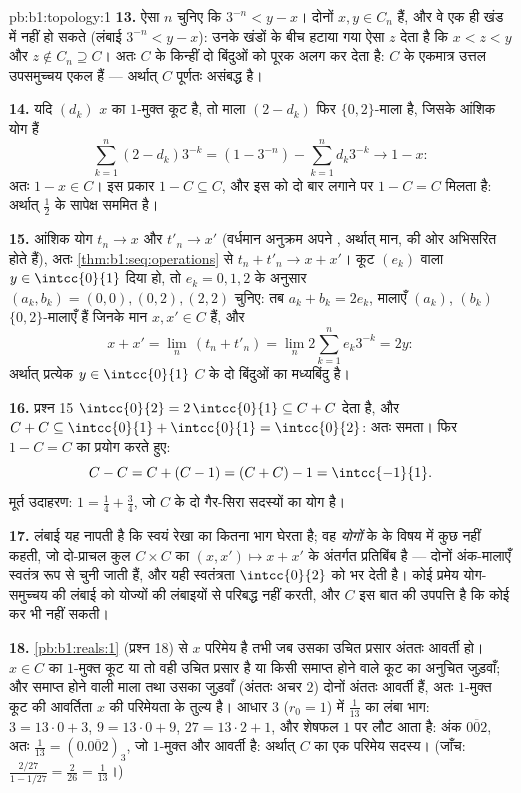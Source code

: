 \begin{solution}{pb:b1:topology:1}
\textbf{13.} ऐसा $n$ चुनिए कि $3^{-n} < y - x$। दोनों $x, y \in C_n$ हैं, और
वे एक ही खंड में नहीं हो सकते (लंबाई $3^{-n} < y - x$): उनके खंडों के बीच
हटाया गया  ऐसा $z$ देता है कि $x < z < y$ और $z \notin C_n \supseteq
C$। अतः $C$ के किन्हीं दो बिंदुओं को पूरक अलग कर देता है: $C$ के एकमात्र
उत्तल उपसमुच्चय एकल  हैं --- अर्थात् $C$ पूर्णतः असंबद्ध है।

\textbf{14.} यदि $(d_k)$ $x$ का $1$-मुक्त कूट है, तो माला $(2 - d_k)$ फिर
$\{0,2\}$-माला है, जिसके आंशिक योग हैं
\[
\sum_{k=1}^{n} (2 - d_k)3^{-k} = (1 - 3^{-n}) - \sum_{k=1}^n
d_k 3^{-k} \longrightarrow 1 - x :
\]
अतः $1 - x \in C$। इस प्रकार $1 - C \subseteq C$, और इस  को दो
बार लगाने पर $1 - C = C$ मिलता है: अर्थात्  $\frac12$ के
सापेक्ष सममित है।

\textbf{15.} आंशिक योग $t_n \to x$ और $t'_n \to x'$ (वर्धमान अनुक्रम अपने
, अर्थात् मान, की ओर अभिसरित होते हैं), अतः
\cref{thm:b1:seq:operations} से $t_n + t'_n \to x + x'$। कूट $(e_k)$ वाला $y
\in \intcc{0}{1}$ दिया हो, तो $e_k = 0, 1, 2$ के अनुसार $(a_k, b_k) = (0,0),
(0,2), (2,2)$ चुनिए: तब $a_k + b_k = 2e_k$, मालाएँ $(a_k)$, $(b_k)$
$\{0,2\}$-मालाएँ हैं जिनके मान $x, x' \in C$ हैं, और
\[
x + x' = \lim_n\,(t_n + t'_n) = \lim_n 2\sum_{k=1}^n e_k 3^{-k}
= 2y :
\]
अर्थात् प्रत्येक $y \in \intcc{0}{1}$ $C$ के दो बिंदुओं का मध्यबिंदु है।

\textbf{16.} प्रश्न 15 $\intcc{0}{2} = 2\,\intcc{0}{1} \subseteq C + C$ देता
है, और $C + C \subseteq \intcc{0}{1} + \intcc{0}{1} = \intcc{0}{2}$: अतः
समता। फिर $1 - C = C$ का प्रयोग करते हुए:
\[
C - C = C + (C - 1) = (C + C) - 1 = \intcc{-1}{1} .
\]
मूर्त उदाहरण: $1 = \frac14 + \frac34$, जो $C$ के दो गैर-सिरा सदस्यों का योग
है।

\textbf{17.} लंबाई यह नापती है कि  स्वयं रेखा का कितना भाग घेरता है;
वह \emph{योगों} के  के विषय में कुछ नहीं कहती, जो दो-प्राचल कुल $C
\times C$ का $(x, x') \mapsto x + x'$ के अंतर्गत प्रतिबिंब है --- दोनों
अंक-मालाएँ स्वतंत्र रूप से चुनी जाती हैं, और यही स्वतंत्रता $\intcc{0}{2}$
को भर देती है। कोई प्रमेय योग-समुच्चय की लंबाई को योज्यों की लंबाइयों से
परिबद्ध नहीं करती, और $C$ इस बात की उपपत्ति है कि कोई कर भी नहीं सकती।

\textbf{18.} \cref{pb:b1:reals:1} (प्रश्न 18) से $x$ परिमेय है तभी जब उसका
उचित प्रसार अंततः आवर्ती हो। $x \in C$ का $1$-मुक्त कूट या तो वही उचित
प्रसार है या किसी समाप्त होने वाले कूट का अनुचित जुड़वाँ; और समाप्त होने
वाली माला तथा उसका जुड़वाँ (अंततः अचर $2$) दोनों अंततः आवर्ती हैं, अतः
$1$-मुक्त कूट की आवर्तिता $x$ की परिमेयता के तुल्य है। आधार $3$ ($r_0 = 1$)
में $\frac1{13}$ का लंबा भाग: $3 = 13\cdot0 + 3$, $9 = 13\cdot0 + 9$, $27 =
13\cdot2 + 1$, और शेषफल $1$ पर लौट आता है: अंक $\overline{002}$, अतः
$\frac1{13} = (0.\overline{002})_3$, जो $1$-मुक्त और आवर्ती है: अर्थात् $C$
का एक परिमेय सदस्य। (जाँच: $\frac{2/27}{1 - 1/27} = \frac{2}{26} =
\frac1{13}$।)


\end{solution}
